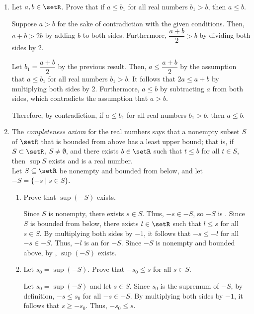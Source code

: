 \begin{enumerate}
  \item Let $a, b \in \setR$. Prove that if $a \leq b_1$ for all real numbers $b_1>b$, then $a \leq b$.
  \begin{subprove}
    Suppose $a > b$ for the sake of contradiction with the given conditions.
    Then, $a + b > 2b$ by adding $b$ to both sides. Furthermore, $\dfrac{a+b}{2} > b$ by dividing both sides by 2.

    Let $b_1 = \dfrac{a+b}{2}$ by the previous result.
    Then, $a \leq \dfrac{a+b}{2}$ by the assumption that $a \leq b_1$ for all real numbers $b_1 > b$.
    It follows that $2a \leq a + b$ by multiplying both sides by 2.
    Furthermore, $a \leq b$ by subtracting $a$ from both sides, which contradicts the assumption that $a > b$.

    Therefore, by contradiction, if $a \leq b_1$ for all real numbers $b_1>b$, then $a \leq b$.
  \end{subprove}




  

  

  \newpage

  \item The \textit{completeness axiom} for the real numbers says that a nonempty subset 
  $S$ of $\setR$ that is bounded from above has a least upper bound; that is, 
  if $S \subset \setR$, $S \neq \emptyset$, and there exists $b \in \setR$ 
  such that $t \leq b$ for all $t \in S$, then $\sup S$ exists and is a real number. \\
  Let $S \subseteq \setR$ be nonempty and bounded from below, and let $-S=\{-s \mid s \in S\}$.
  \begin{enumerate}
    \item Prove that $\sup (-S)$ exists.
    \begin{subprove}
      Since $S$ is nonempty, there exists $s \in S$.
      Thus, $-s \in -S$, so $-S$ is .
      Since $S$ is bounded from below, there exists $l \in \setR$ such that $l \leq s$ for all $s \in S$.
      By multiplying both sides by $-1$, it follows that $-s \leq -l$ for all $-s \in -S$.
      Thus, $-l$ is an  for $-S$.      
      Since $-S$ is nonempty and bounded above, by , $\sup(-S)$ exists.
    \end{subprove}
    \item Let $s_0=\sup (-S)$. Prove that $-s_0 \leq s$ for all $s \in S$.
    \begin{subprove}
      Let $s_0 = \sup(-S)$ and let $s \in S$.      
      Since $s_0$ is the supremum of $-S$, by definition, $-s \leq s_0$ for all $-s \in -S$.
      By multiplying both sides by $-1$, it follows that $s \geq -s_0$.
      Thus, $-s_0 \leq s$.
      

\end{subprove}
\end{enumerate}
\end{enumerate}

